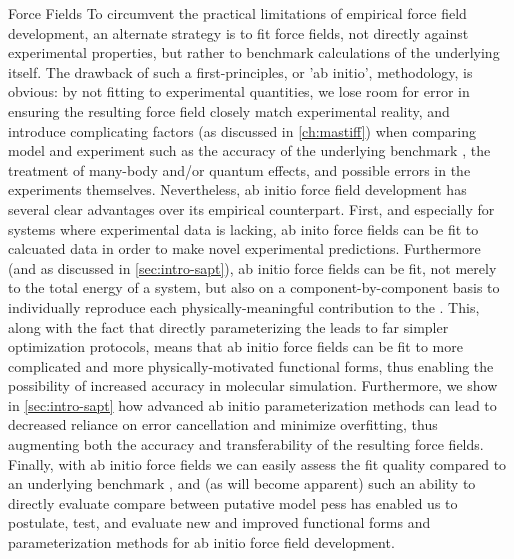 \begin{section}{Force Fields}
To circumvent the practical limitations of empirical force field development,
an alternate strategy is to fit force fields, not directly against
experimental properties, but rather to benchmark calculations of the
underlying \pes itself.\cite{Stone2007} 
The drawback of such a first-principles, or 'ab initio', methodology, is
obvious: by not fitting to experimental quantities, we lose room for error in
ensuring the resulting force field closely match experimental reality,
and introduce complicating factors (as discussed in \cref{ch:mastiff}) when
comparing model and experiment such as the accuracy of the underlying
benchmark \pes, the treatment of many-body and/or quantum effects, and
possible errors in the experiments themselves.
\cite{Johnson2009,Taylor2016,Chalasinski2000}
Nevertheless, ab initio force field development has several clear advantages
over its empirical counterpart. 
First, and especially for systems where experimental data is lacking, ab inito
force fields can be fit to calcuated data in order to make novel experimental
predictions. Furthermore (and as discussed in \cref{sec:intro-sapt}), ab
initio force fields can be fit, not merely to the total energy of a system,
but also on a component-by-component basis to individually reproduce each
physically-meaningful contribution to the \pes. This, along with the fact that
directly parameterizing the \pes leads to far simpler optimization protocols,
means that ab initio force fields can be fit to more complicated and more
physically-motivated functional
forms, thus enabling the possibility of increased accuracy in molecular
simulation. Furthermore, we show in \cref{sec:intro-sapt} how advanced
ab initio parameterization methods can lead to decreased reliance on error
cancellation and minimize overfitting, thus augmenting both the accuracy and
transferability of the resulting force fields. Finally, with ab initio force
fields we can easily assess the fit quality compared to an underlying
benchmark \pes, and
(as will become apparent) such an ability to
directly evaluate compare between putative model \glspl{pes} has enabled us to
postulate, test, and evaluate new and improved functional forms and parameterization
methods for ab initio force field development. 

\end{section}



